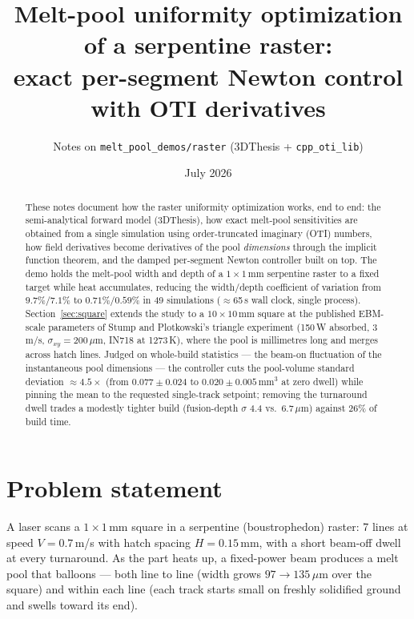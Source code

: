 \documentclass[11pt]{article}
\title{Melt-pool uniformity optimization of a serpentine raster:\\
       exact per-segment Newton control with OTI derivatives}
\author{Notes on \texttt{melt\_pool\_demos/raster} (3DThesis + \texttt{cpp\_oti\_lib})}
\date{July 2026}
\begin{document}
\maketitle

\begin{abstract}
These notes document how the raster uniformity optimization works, end to end:
the semi-analytical forward model (3DThesis), how exact melt-pool
sensitivities are obtained from a single simulation using order-truncated
imaginary (OTI) numbers, how field derivatives become derivatives of the pool
\emph{dimensions} through the implicit function theorem, and the damped
per-segment Newton controller built on top. The demo holds the melt-pool
width and depth of a $1\times1$\,mm serpentine raster to a fixed target while
heat accumulates, reducing the width/depth coefficient of variation from
$9.7\%/7.1\%$ to $0.71\%/0.59\%$ in 49 simulations ($\approx$65\,s wall
clock, single process). Section~\ref{sec:square} extends the study to a
$10\times10$\,mm square at the published EBM-scale parameters of Stump and
Plotkowski's triangle experiment (150\,W absorbed, 3\,m/s,
$\sigma_{xy}=200\,\mu$m, IN718 at 1273\,K), where the pool is millimetres
long and merges across hatch lines. Judged on whole-build statistics ---
the beam-on fluctuation of the instantaneous pool dimensions --- the
controller cuts the pool-volume standard deviation $\approx4.5\times$
(from $0.077\pm0.024$ to $0.020\pm0.005$\,mm$^3$ at zero dwell) while
pinning the mean to the requested single-track setpoint; removing the
turnaround dwell trades a modestly tighter build (fusion-depth
$\sigma$ 4.4 vs.\ 6.7\,$\mu$m) against 26\% of build time.
\end{abstract}

\section{Problem statement}

A laser scans a $1\times1$\,mm square in a serpentine (boustrophedon) raster:
7 lines at speed $V=0.7$\,m/s with hatch spacing $H=0.15$\,mm, with a short
beam-off dwell at every turnaround. As the part heats up, a fixed-power beam
produces a melt pool that balloons --- both line to line (width grows
$97\to135\,\mu$m over the square) and within each line (each track starts
small on freshly solidified ground and swells toward its end).
\end{document}
